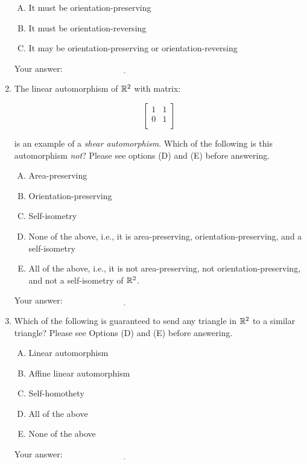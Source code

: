 \documentclass[10pt]{amsart}
\begin{document}
\begin{enumerate}
  \begin{enumerate}[(A)]
  \item It must be orientation-preserving
  \item It must be orientation-reversing
  \item It may be orientation-preserving or orientation-reversing
  \end{enumerate}

  \vspace{0.1in}
  Your answer: $\underline{\qquad\qquad\qquad\qquad\qquad\qquad\qquad}$
  \vspace{0.1in}

\item The linear automorphism of $\mathbb{R}^2$ with matrix:

  $$\left[\begin{matrix} 1 & 1 \\ 0 & 1 \\\end{matrix}\right]$$

  is an example of a {\em shear automorphism}. Which of the following
  is this automorphism {\em not}? Please see options (D) and (E)
  before answering.

  \begin{enumerate}[(A)]
  \item Area-preserving
  \item Orientation-preserving
  \item Self-isometry
  \item None of the above, i.e., it is area-preserving,
    orientation-preserving, and a self-isometry
  \item All of the above, i.e., it is not area-preserving, not
    orientation-preserving, and not a self-isometry of $\mathbb{R}^2$.
  \end{enumerate}

  \vspace{0.1in}
  Your answer: $\underline{\qquad\qquad\qquad\qquad\qquad\qquad\qquad}$
  \vspace{0.1in}

\item Which of the following is guaranteed to send any triangle in
  $\mathbb{R}^2$ to a similar triangle? Please see Options (D) and (E) before
  answering.

  \begin{enumerate}[(A)]
  \item Linear automorphism
  \item Affine linear automorphism
  \item Self-homothety
  \item All of the above
  \item None of the above
  \end{enumerate}

  \vspace{0.1in}
  Your answer: $\underline{\qquad\qquad\qquad\qquad\qquad\qquad\qquad}$
  \vspace{0.1in}

\end{enumerate}
\end{document}
